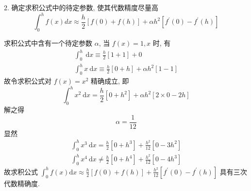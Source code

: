 \begin{tcolorbox}[breakable,
		colframe=white!10!jingga, coltitle=white!90!jingga, colback=white!95!jingga, coltext=black, colbacktitle=white!10!jingga, enhanced, fonttitle=\bfseries,fontupper=\normalsize, attach boxed title to top left={yshift=-2mm}, before skip=8pt, after skip=8pt,
		title=解答题]

2. 确定求积公式中的待定参数, 使其代数精度尽量高
$$
\int_{0}^{h} f(x) d x \approx \frac{h}{2}[f(0)+f(h)]+\alpha h^{2}\left[f^{\prime}(0)-f^{\prime}(h)\right]
$$

   \tcblower
求积公式中含有一个待定参数 $ \alpha $, 当 $ f(x)=1, x $ 时, 有
$$
\begin{array}{c}
\displaystyle\int_{0}^{h} \mathrm{~d} x \equiv \frac{h}{2}[1+1]+0 \\
\displaystyle\int_{0}^{h} x \mathrm{~d} x \equiv \frac{h}{2}[0+h]+\alpha h^{2}[1-1]
\end{array}
$$
故令求积公式对 $ f(x)=x^{2} $ 精确成立, 即
$$
\int_{0}^{h} x^{2} \mathrm{~d} x=\frac{h}{2}\left[0+h^{2}\right]+\alpha h^{2}[2 \times 0-2 h]
$$
解之得
$$
\alpha=\frac{1}{12}
$$
显然
$$
\begin{array}{l}
\displaystyle\int_{0}^{h} x^{3} \mathrm{~d} x=\frac{h}{2}\left[0+h^{3}\right]+\frac{h^{2}}{12}\left[0-3 h^{2}\right] \\
\displaystyle\int_{0}^{h} x^{4} \mathrm{~d} x \neq \frac{h}{2}\left[0+h^{4}\right]+\frac{h^{2}}{12}\left[0-4 h^{3}\right]
\end{array}
$$
故求积公式
$
\displaystyle\int_{0}^{h} f(x) \mathrm{d} x \approx \frac{h}{2}[f(0)+f(h)]+\frac{h^{2}}{12}\left[f^{\prime}(0)-f^{\prime}(h)\right]
$
具有三次代数精确度.
\end{tcolorbox}



